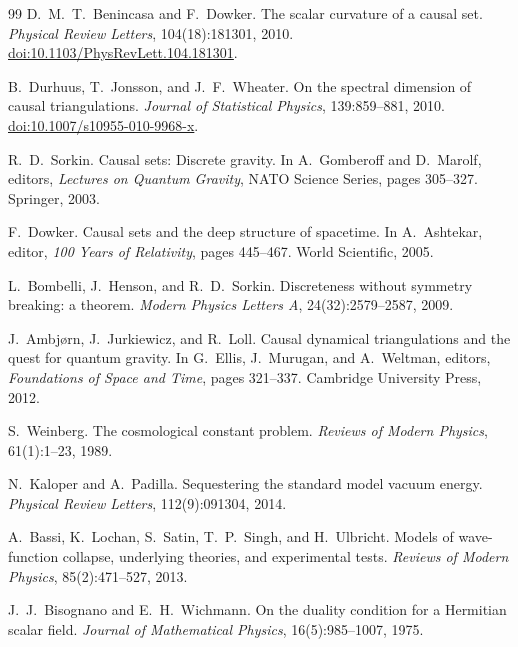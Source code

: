 \documentclass[11pt,a4paper]{article}
\theoremstyle{plain}
\theoremstyle{definition}
\theoremstyle{remark}
\begin{document}
\begin{thebibliography}{99}
D.~M.~T.~Benincasa and F.~Dowker.
\newblock The scalar curvature of a causal set.
\newblock \emph{Physical Review Letters}, 104(18):181301, 2010.
\newblock \href{https://doi.org/10.1103/PhysRevLett.104.181301}{doi:10.1103/PhysRevLett.104.181301}.

B.~Durhuus, T.~Jonsson, and J.~F.~Wheater.
\newblock On the spectral dimension of causal triangulations.
\newblock \emph{Journal of Statistical Physics}, 139:859--881, 2010.
\newblock \href{https://doi.org/10.1007/s10955-010-9968-x}{doi:10.1007/s10955-010-9968-x}.

R.~D.~Sorkin.
\newblock Causal sets: Discrete gravity.
\newblock In A.~Gomberoff and D.~Marolf, editors, \textit{Lectures on Quantum
  Gravity}, NATO Science Series, pages 305--327. Springer, 2003.

F.~Dowker.
\newblock Causal sets and the deep structure of spacetime.
\newblock In A.~Ashtekar, editor, \textit{100 Years of Relativity}, pages
  445--467. World Scientific, 2005.

L.~Bombelli, J.~Henson, and R.~D.~Sorkin.
\newblock Discreteness without symmetry breaking: a theorem.
\newblock \textit{Modern Physics Letters A}, 24(32):2579--2587, 2009.

J.~Ambjørn, J.~Jurkiewicz, and R.~Loll.
\newblock Causal dynamical triangulations and the quest for quantum gravity.
\newblock In G.~Ellis, J.~Murugan, and A.~Weltman, editors,
  \textit{Foundations of Space and Time}, pages 321--337.
  Cambridge University Press, 2012.

S.~Weinberg.
\newblock The cosmological constant problem.
\newblock \textit{Reviews of Modern Physics}, 61(1):1--23, 1989.

N.~Kaloper and A.~Padilla.
\newblock Sequestering the standard model vacuum energy.
\newblock \textit{Physical Review Letters}, 112(9):091304, 2014.

A.~Bassi, K.~Lochan, S.~Satin, T.~P.~Singh, and H.~Ulbricht.
\newblock Models of wave-function collapse, underlying theories, and
  experimental tests.
\newblock \textit{Reviews of Modern Physics}, 85(2):471--527, 2013.

J.~J.~Bisognano and E.~H.~Wichmann.
\newblock On the duality condition for a Hermitian scalar field.
\newblock \textit{Journal of Mathematical Physics}, 16(5):985--1007, 1975.


\end{thebibliography}
\end{document}

